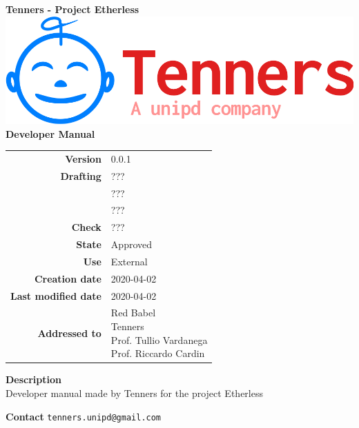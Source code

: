 \begin{titlepage}
	\begin{center}
		\large \textbf{Tenners - Project Etherless}
		\vfill
		\includegraphics[scale = 0.3]{./res/img/logo.png}\\
		\vfill
		\Huge \textbf{Developer Manual}

        \vfill
        \large

        \begin{tabular}{r|l}
                        \textbf{Version} & 0.0.1 \\
                        \textbf{Drafting} &
                        ???\\&
                        ???\\&
						???\\
                        \textbf{Check} &
                        ???\\
                        \textbf{State} & Approved \\
                        \textbf{Use} & External\\
                        \textbf{Creation date} &  2020-04-02\\
                        \textbf{Last modified date} &  2020-04-02\\
                        \textbf{Addressed to} & \parbox[t]{5cm}{Red Babel \\Tenners \\Prof. Tullio Vardanega \\Prof. Riccardo Cardin
                        							}
                \end{tabular}
                \vfill
                \normalsize
                \vfill
                                \textbf{Description}
                \\Developer manual made by Tenners for the project Etherless
                \vfill
                \normalsize
                \vfill
                
                \textbf{Contact}
                \texttt{tenners.unipd@gmail.com}

	\end{center}
\end{titlepage}
